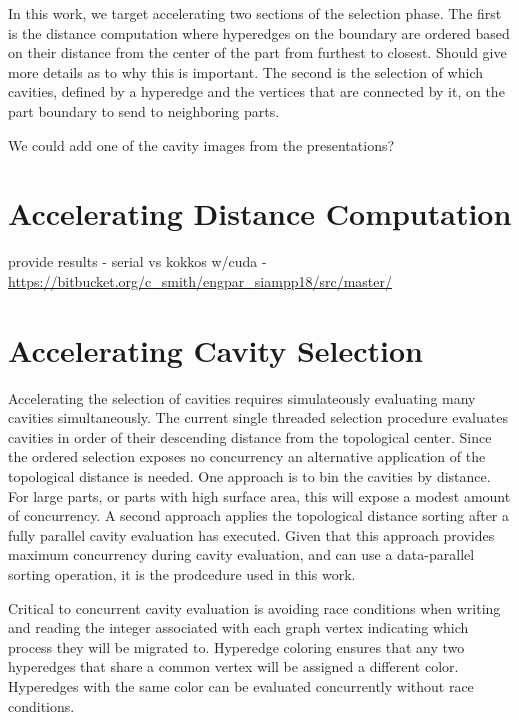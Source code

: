 \documentclass[graybox]{svmult}
\begin{document}
In this work, we target accelerating two sections of the selection phase. The first is
the distance computation where hyperedges on the boundary are ordered based on their
distance from the center of the part from furthest to closest.
{\color{red}Should give more details as to why this is important.}
The second is the selection of which cavities, defined by a hyperedge and the
vertices that are connected by it, on the part boundary to send to neighboring parts.

{\color{red} We could add one of the cavity images from the presentations?}


\section{Accelerating Distance Computation} \label{sec:dist}

provide results - serial vs kokkos w/cuda -
\url{https://bitbucket.org/c_smith/engpar_siampp18/src/master/}

\section{Accelerating Cavity Selection} \label{sec:select}

Accelerating the selection of cavities requires simulateously evaluating many
cavities simultaneously.
The current single threaded selection procedure evaluates cavities in order of
their descending distance from the topological center.
Since the ordered selection exposes no concurrency an alternative application of
the topological distance is needed.
One approach is to bin the cavities by distance.
For large parts, or parts with high surface area, this will expose a modest
amount of concurrency.
A second approach applies the topological distance sorting after a fully
parallel cavity evaluation has executed.
Given that this approach provides maximum concurrency during cavity evaluation,
and can use a data-parallel sorting operation, it is the prodcedure used in this
work.

Critical to concurrent cavity evaluation is avoiding race conditions when
writing and reading the integer associated with each graph vertex indicating
which process they will be migrated to.
Hyperedge coloring ensures that any two hyperedges that share a common vertex
will be assigned a different color.
Hyperedges with the same color can be evaluated concurrently without
race conditions.
\end{document}
